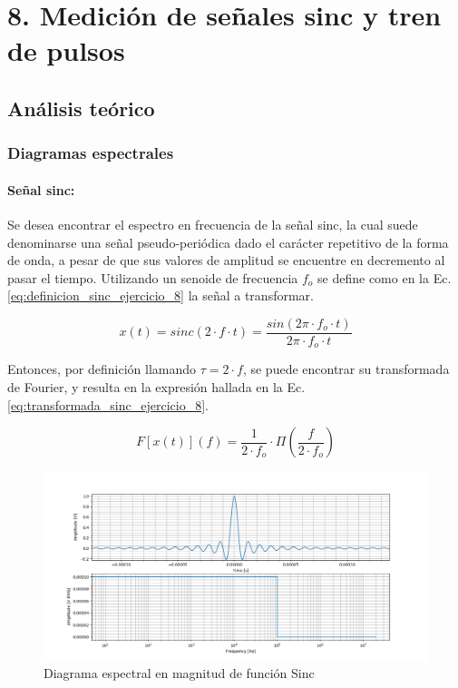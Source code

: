 \section{8. Medici\'on de se\~nales sinc y tren de pulsos}

\subsection{An\'alisis te\'orico}

\subsubsection{Diagramas espectrales}

\paragraph{Se\~nal sinc:} Se desea encontrar el espectro en frecuencia de la se\~nal sinc, la cual suede denominarse una se\~nal pseudo-peri\'odica
dado el car\'acter repetitivo de la forma de onda, a pesar de que sus valores de amplitud se encuentre en decremento al pasar el tiempo. Utilizando un senoide
de frecuencia $f_o$ se define como en la Ec. \ref{eq:definicion_sinc_ejercicio_8} la se\~nal a transformar.

\begin{equation}
    x(t) = sinc(2 \cdot f \cdot t) = \frac{sin(2 \pi \cdot f_o \cdot t)}{2 \pi \cdot f_o \cdot t}
    \label{eq:definicion_sinc_ejercicio_8}
\end{equation}

Entonces, por definici\'on llamando $\tau = 2 \cdot f$, se puede encontrar su transformada de Fourier, y resulta en la expresi\'on
hallada en la Ec. \ref{eq:transformada_sinc_ejercicio_8}.

\begin{equation}
    F \left[ x(t) \right](f) = \frac{1}{2 \cdot f_o} \cdot \Pi \left( \frac{f}{2 \cdot f_o} \right)
    \label{eq:transformada_sinc_ejercicio_8}
\end{equation}

\begin{figure}[H]
    \centering
    \includegraphics[scale=0.45]{Recursos/sinc.png}
    \caption{Diagrama espectral en magnitud de funci\'on Sinc}
\end{figure}

